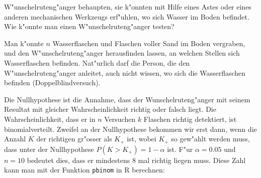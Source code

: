 W"unschelruteng"anger behaupten, sie k"onnten mit Hilfe eines Astes
oder eines anderen mechanischen Werkzeugs erf"uhlen, wo sich Wasser
im Boden befindet. Wie k"onnte man einen W"unschelruteng"anger testen?

\begin{loesung}
Man k"onnte $n$ Wasserflaschen und Flaschen voller Sand im Boden vergraben,
und den W"unschelruteng"anger herausfinden lassen, an welchen Stellen
sich Wasserflaschen befinden. Nat"urlich darf die Person, die den
W"unschelruteng"anger anleitet, auch nicht wissen, wo sich die
Wasserflaschen befinden (Doppelblindversuch).

Die Nullhypothese ist die Annahme, dass der Wunschelruteng"anger mit
seinem Resultat mit
gleicher Wahrscheinlichkeit richtig oder falsch liegt.
Die Wahrscheinlichkeit, dass er  in $n$ Versuchen
$k$ Flaschen richtig detektiert, ist
binomialverteilt. Zweifel an der Nullhypothese bekommen wir erst
dann, wenn die Anzahl $K$ der richtigen gr"osser als $K_+$ ist, wobei
$K_+$ so gew"ahlt werden muss, dass unter der Nullhypothese
$P(K>K_+)=1-\alpha$ ist. F"ur $\alpha=0.05$ und $n=10$ bedeutet
dies, dass er mindestens 8 mal richtig liegen muss. Diese Zahl
kann man mit der Funktion {\tt pbinom} in R berechnen:
\end{loesung}

